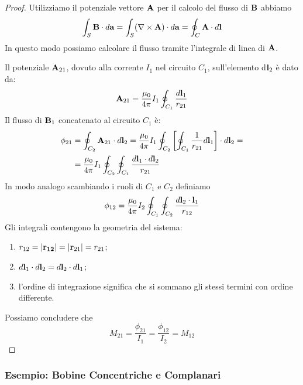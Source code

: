 \begin{proof}
Utilizziamo il potenziale vettore $\bold{A}$ per il calcolo del flusso di $\bold{B}$ abbiamo
\begin{equation*}
	\int_{S}\bold{B} \cdot d\bold{a} = \int_{S}(\nabla \times \bold{A}) \cdot d\bold{a} = \oint_{C} \bold{A} \cdot d\bold{l}
\end{equation*}	
In questo modo possiamo calcolare il flusso tramite l'integrale di linea di $\bold{A}$.

Il potenziale $\bold{A}_{21}$, dovuto alla corrente $I_1$ nel circuito $C_1$, sull'elemento d$\bold{l}_2$ \`e dato da:
\begin{equation*}
	\bold{A}_{21}= \frac{\mu_0 }{4 \pi}	I_1 \oint_{C_1}\frac{d \bold{l}_1}{r_{21}}
\end{equation*} 
Il flusso di $\bold{B}_1$ concatenato al circuito $C_1$ \`e:
\begin{align*}
	\phi_{21} & = \oint_{C_2} \bold{A}_{21} \cdot d\bold{l}_2 = \frac{\mu_0}{4 \pi}I_1 \oint_{C_2}\left[\oint_{C_1} \frac{1}{r_{21}}d\bold{l}_1 \right] \cdot d\bold{l}_2 = \\ \rule{0pt}{15pt}
	& = \frac{\mu_0}{4 \pi}I_1 \oint_{C_2} \oint_{C_1} \frac{d \bold{l}_1 \cdot d\bold{l}_2}{r_{21}}
\end{align*}
In modo analogo scambiando i ruoli di $C_1$ e $C_2$ definiamo
\begin{equation*}
	\phi_{12} = \frac{\mu_0}{4 \pi}I_2 \oint_{C_1}\oint_{C_2} \frac{d \bold{l}_2 \cdot \bold{l}_1}{r_{12}}
\end{equation*}
Gli integrali contengono la geometria del sistema:
\begin{enumerate}
	\item $r_{12} = |\bold{r_{12}}| = |\bold{r}_{21}| = r_{21}$;
	\item $d \bold{l}_1 \cdot d \bold{l}_2 = d \bold{l}_2 \cdot d\bold{l}_1$;
	\item l'ordine di integrazione significa che si sommano gli stessi termini con ordine differente.
\end{enumerate}
Possiamo concludere che 
\begin{equation*}
	M_{21} = \frac{\phi_{21}}{I_1} = \frac{\phi_{12}}{I_2} = M_{12}
\end{equation*}

\end{proof}

\subsubsection{Esempio: Bobine Concentriche e Complanari}

